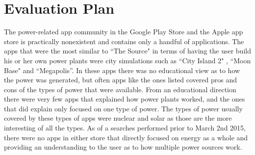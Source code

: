 \documentclass[msc,oneside]{ubcthesis}%
\begin{document}





\chapter{Evaluation Plan}

The power-related app community in the Google Play Store and the Apple app store is practically nonexistent and contains only a handful of applications. The apps that were the most similar to ``The Source" in terms of having the user build his or her own power plants were city simulations such as ``City Island 2" \cite{CityIsland2}, ``Moon Base"\cite{MoonBase} and ``Megapolis''\cite{Megapolis}. In these apps there was no educational view as to how the power was generated, but often apps like the ones listed covered pros and cons of the types of power that were available. From an educational direction there were very few apps that explained how power plants worked, and the ones that did explain only focused on one type of power. The types of power usually covered by these types of apps were nuclear and solar as those are the more interesting of all the types. As of a searches performed prior to March 2nd 2015, there were no apps in either store that directly focused on energy as a whole and providing an understanding to the user as to how multiple power sources work.
\end{document}
